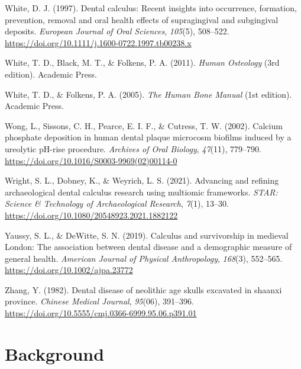 \documentclass[
  b5paper,
]{book}
\newlength{\cslhangindent}
\newenvironment{CSLReferences}[2] %
 {\begin{list}{}{%
  \setlength{\itemindent}{0pt}
  \setlength{\leftmargin}{0pt}
  \setlength{\parsep}{0pt}
  \ifodd #1
   \setlength{\leftmargin}{\cslhangindent}
   \setlength{\itemindent}{-1\cslhangindent}
  \fi
  \setlength{\itemsep}{#2\baselineskip}}}
 {\end{list}}
\begin{document}
\begin{CSLReferences}{1}{0}
White, D. J. (1997). Dental calculus: Recent insights into occurrence,
formation, prevention, removal and oral health effects of supragingival
and subgingival deposits. \emph{European Journal of Oral Sciences},
\emph{105}(5), 508--522.
\url{https://doi.org/10.1111/j.1600-0722.1997.tb00238.x}

White, T. D., Black, M. T., \& Folkens, P. A. (2011). \emph{Human
{Osteology}} (3rd edition). {Academic Press}.

White, T. D., \& Folkens, P. A. (2005). \emph{The {Human Bone Manual}}
(1st edition). {Academic Press}.

Wong, L., Sissons, C. H., Pearce, E. I. F., \& Cutress, T. W. (2002).
Calcium phosphate deposition in human dental plaque microcosm biofilms
induced by a ureolytic {pH-rise} procedure. \emph{Archives of Oral
Biology}, \emph{47}(11), 779--790.
\url{https://doi.org/10.1016/S0003-9969(02)00114-0}

Wright, S. L., Dobney, K., \& Weyrich, L. S. (2021). Advancing and
refining archaeological dental calculus research using multiomic
frameworks. \emph{STAR: Science \& Technology of Archaeological
Research}, \emph{7}(1), 13--30.
\url{https://doi.org/10.1080/20548923.2021.1882122}

Yaussy, S. L., \& DeWitte, S. N. (2019). Calculus and survivorship in
medieval {London}: {The} association between dental disease and a
demographic measure of general health. \emph{American Journal of
Physical Anthropology}, \emph{168}(3), 552--565.
\url{https://doi.org/10.1002/ajpa.23772}

Zhang, Y. (1982). Dental disease of neolithic age skulls excavated in
shaanxi province. \emph{Chinese Medical Journal}, \emph{95}(06),
391--396. \url{https://doi.org/10.5555/cmj.0366-6999.95.06.p391.01}

\end{CSLReferences}


\chapter{Background}\label{chap-background}
\end{document}
